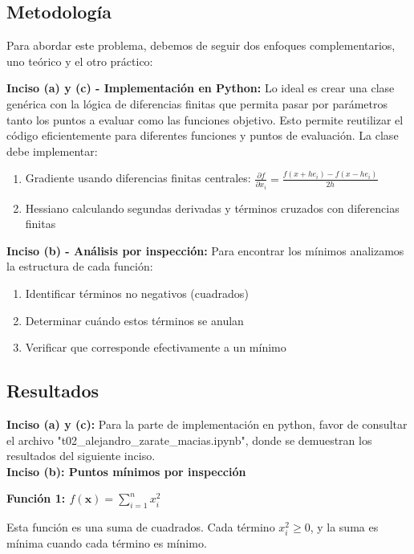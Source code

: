\documentclass{article}
\begin{document}
\subsection{Metodología}

Para abordar este problema, debemos de seguir dos enfoques complementarios, uno teórico y el otro práctico: 

\textbf{Inciso (a) y (c) - Implementación en Python:}
Lo ideal es crear una clase genérica con la lógica de diferencias finitas que permita pasar por parámetros tanto los puntos a evaluar como las funciones objetivo. Esto permite reutilizar el código eficientemente para diferentes funciones y puntos de evaluación. La clase debe implementar:
\begin{enumerate}
    \item Gradiente usando diferencias finitas centrales: $\frac{\partial f}{\partial x_i} = \frac{f(x + h e_i) - f(x - h e_i)}{2h}$
    \item Hessiano calculando segundas derivadas y términos cruzados con diferencias finitas
\end{enumerate}

\textbf{Inciso (b) - Análisis por inspección:}
Para encontrar los mínimos analizamos la estructura de cada función:
\begin{enumerate}
    \item Identificar términos no negativos (cuadrados)
    \item Determinar cuándo estos términos se anulan
    \item Verificar que corresponde efectivamente a un mínimo
\end{enumerate}

\subsection{Resultados}
\setcounter{equation}{0}

\textbf{Inciso (a) y (c):}
Para la parte de implementación en python, favor de consultar el archivo "t02\_alejandro\_zarate\_macias.ipynb", donde se demuestran los resultados del siguiente inciso.\\

\textbf{Inciso (b): Puntos mínimos por inspección}

\textbf{Función 1: $f(\mathbf{x}) = \sum_{i=1}^{n} x_i^{2}$}

Esta función es una suma de cuadrados. Cada término $x_i^2 \geq 0$, y la suma es mínima cuando cada término es mínimo.
\end{document}
